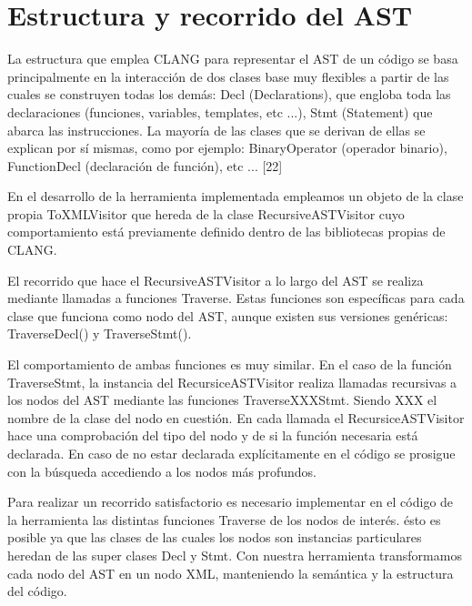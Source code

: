 \section{Estructura y recorrido del AST}

La estructura que emplea CLANG para representar el AST de un c\'odigo se basa principalmente en la interacci\'on de dos clases base muy flexibles a partir de las cuales se construyen todas los dem\'as: Decl (Declarations), que engloba toda las declaraciones (funciones, variables, templates, etc ...), Stmt (Statement) que abarca las instrucciones. La mayor\'ia de las clases que se derivan de ellas se explican por s\'i mismas, como por ejemplo: BinaryOperator (operador binario), FunctionDecl (declaraci\'on de funci\'on), etc ... [22]

En el desarrollo de la herramienta implementada empleamos un objeto de la clase propia ToXMLVisitor que hereda de la clase RecursiveASTVisitor cuyo comportamiento est\'a previamente definido dentro de las bibliotecas propias de CLANG.

El recorrido que hace el RecursiveASTVisitor a lo largo del AST se realiza mediante llamadas a funciones Traverse. Estas funciones son espec\'ificas para cada clase que funciona como nodo del AST, aunque existen sus versiones gen\'ericas: TraverseDecl() y TraverseStmt().

El comportamiento de ambas funciones es muy similar. En el caso de la funci\'on TraverseStmt, la instancia del RecursiceASTVisitor realiza llamadas recursivas a los nodos del AST mediante las funciones TraverseXXXStmt. Siendo XXX el nombre de la clase del nodo en cuesti\'on. En cada llamada el RecursiceASTVisitor hace una comprobaci\'on del tipo del nodo y de si la funci\'on necesaria est\'a declarada. En caso de no estar declarada expl\'icitamente en el c\'odigo se prosigue con la b\'usqueda accediendo a los nodos m\'as profundos.

Para realizar un recorrido satisfactorio es necesario implementar en el c\'odigo de la herramienta las distintas funciones Traverse de los nodos de inter\'es. \'esto es posible ya que las clases de las cuales los nodos son instancias particulares heredan de las super clases Decl y Stmt. Con nuestra herramienta transformamos cada nodo del AST en un nodo XML, manteniendo la sem\'antica y la estructura del c\'odigo.

